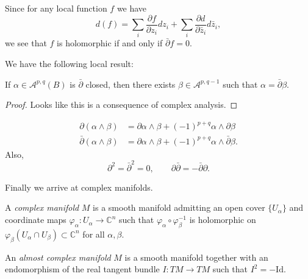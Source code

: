 \noindent
Since for any local function $f$ we have
$$
d(f)=\sum_i\frac{\partial f}{\partial z_i}dz_i
+\sum_i\frac{\partial d}{\partial \bar{z}_i}d\bar{z}_i,
$$
we see that  $f$ is holomorphic if and only if
$\bar\partial f=0$.

\medskip\noindent
We have the following local result:
\begin{lemma}
\label{lemma-poincare-dbar-local-lemma}
\begin{reference}
\cite[Corollary 1.3.9]{huc}
\end{reference}
If $\alpha \in \mathcal{A}^{p,q}(B)$ 
is $\bar\partial$ closed, then there exists
$\beta \in \mathcal{A}^{p,q-1}$ such that
$\alpha=\bar\partial \beta$.
\end{lemma}

\begin{proof}
Looks like this is a consequence of complex analysis.
\end{proof}

\begin{proposition}
\label{proposition-leibniz-for-del}
\begin{align*}
\partial(\alpha\wedge\beta)&=\partial\alpha\wedge\beta
+(-1)^{p+q}\alpha\wedge\partial\beta\\
\bar\partial(\alpha\wedge\beta)
&=\partial\alpha\wedge\beta+(-1)^{p+q}\alpha\wedge\bar\partial\beta.
\end{align*}
Also,
$$
\partial^2=\bar\partial^2=0,\qquad \partial \bar\partial=-\bar\partial \partial.
$$

\end{proposition}


\medskip\noindent
Finally we arrive at complex manifolds.

\begin{definition}
\label{definition-complex-manifold}
A {\it complex manifold} $M$ is a smooth manifold admitting an open cover
$\{U_\alpha\}$ and coordinate maps $\varphi_\alpha:U_\alpha\to\mathbb{C}^n$ such
that $\varphi_\alpha\circ\varphi_\beta^{-1}$ is holomorphic on
$\varphi_\beta(U_\alpha\cap U_\beta)\subset\mathbb{C}^n$ for all $\alpha,\beta$.
\end{definition}

\begin{definition}
\label{definition-almost-complex-manifold}
An {\it almost complex manifold} $M$ is a smooth manifold together with
an endomorphism of the real tangent bundle $I:TM \to TM$
such that $I^2=-\text{Id}$.
\end{definition}

